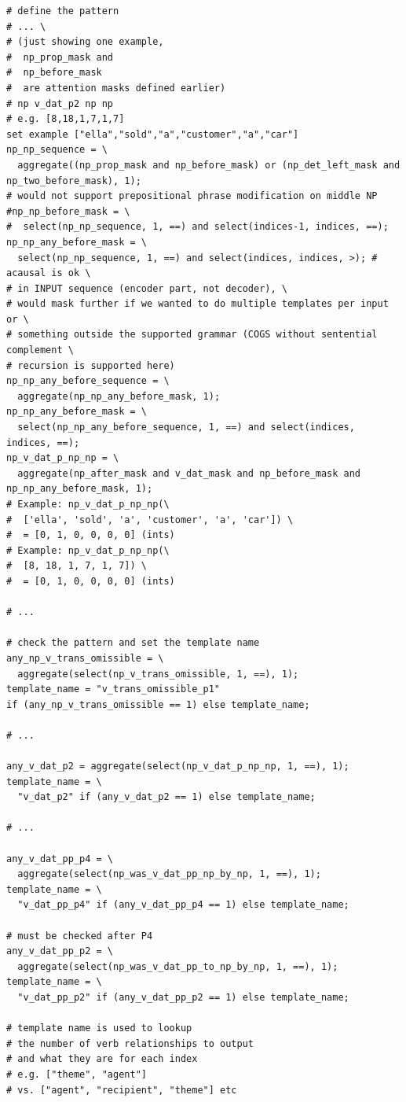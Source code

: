 \documentclass[11pt]{article}
\begin{document}
\begin{tiny}
\begin{verbatim}
# define the pattern
# ... \
# (just showing one example, 
#  np_prop_mask and 
#  np_before_mask 
#  are attention masks defined earlier)
# np v_dat_p2 np np
# e.g. [8,18,1,7,1,7]
set example ["ella","sold","a","customer","a","car"]
np_np_sequence = \
  aggregate((np_prop_mask and np_before_mask) or (np_det_left_mask and np_two_before_mask), 1);
# would not support prepositional phrase modification on middle NP
#np_np_before_mask = \
#  select(np_np_sequence, 1, ==) and select(indices-1, indices, ==);
np_np_any_before_mask = \
  select(np_np_sequence, 1, ==) and select(indices, indices, >); # acausal is ok \
# in INPUT sequence (encoder part, not decoder), \
# would mask further if we wanted to do multiple templates per input or \
# something outside the supported grammar (COGS without sentential complement \
# recursion is supported here)
np_np_any_before_sequence = \
  aggregate(np_np_any_before_mask, 1);
np_np_any_before_mask = \
  select(np_np_any_before_sequence, 1, ==) and select(indices, indices, ==);
np_v_dat_p_np_np = \
  aggregate(np_after_mask and v_dat_mask and np_before_mask and np_np_any_before_mask, 1);
# Example: np_v_dat_p_np_np(\
#  ['ella', 'sold', 'a', 'customer', 'a', 'car']) \
#  = [0, 1, 0, 0, 0, 0] (ints)
# Example: np_v_dat_p_np_np(\
#  [8, 18, 1, 7, 1, 7]) \
#  = [0, 1, 0, 0, 0, 0] (ints)

# ...

# check the pattern and set the template name
any_np_v_trans_omissible = \
  aggregate(select(np_v_trans_omissible, 1, ==), 1);
template_name = "v_trans_omissible_p1" 
if (any_np_v_trans_omissible == 1) else template_name;

# ...

any_v_dat_p2 = aggregate(select(np_v_dat_p_np_np, 1, ==), 1);
template_name = \
  "v_dat_p2" if (any_v_dat_p2 == 1) else template_name;

# ...

any_v_dat_pp_p4 = \
  aggregate(select(np_was_v_dat_pp_np_by_np, 1, ==), 1);
template_name = \
  "v_dat_pp_p4" if (any_v_dat_pp_p4 == 1) else template_name;

# must be checked after P4
any_v_dat_pp_p2 = \
  aggregate(select(np_was_v_dat_pp_to_np_by_np, 1, ==), 1);
template_name = \
  "v_dat_pp_p2" if (any_v_dat_pp_p2 == 1) else template_name;

# template name is used to lookup 
# the number of verb relationships to output
# and what they are for each index
# e.g. ["theme", "agent"] 
# vs. ["agent", "recipient", "theme"] etc
\end{verbatim}
\end{tiny}
\clearpage
\end{document}
